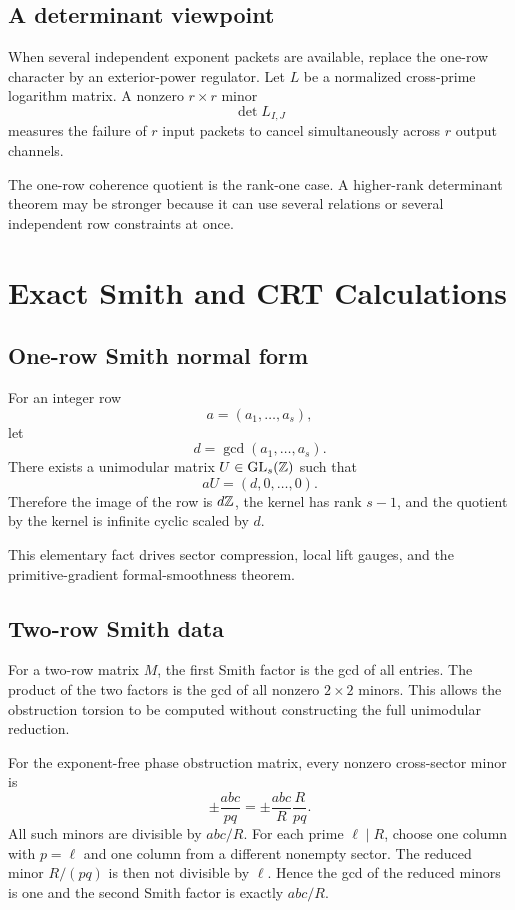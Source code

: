 \section{A determinant viewpoint}
When several independent exponent packets are available, replace the one-row character by an exterior-power regulator. Let $L$ be a normalized cross-prime logarithm matrix. A nonzero $r\times r$ minor
\[
 \det L_{I,J}
\]
measures the failure of $r$ input packets to cancel simultaneously across $r$ output channels.

The one-row coherence quotient is the rank-one case. A higher-rank determinant theorem may be stronger because it can use several relations or several independent row constraints at once.

\chapter{Exact Smith and CRT Calculations}

\section{One-row Smith normal form}
For an integer row
\[
 a=(a_1,\ldots,a_s),
\]
let
\[
 d=\gcd(a_1,\ldots,a_s).
\]
There exists a unimodular matrix $U\in\mathrm{GL}_s(\mathbb Z)$ such that
\[
 aU=(d,0,\ldots,0).
\]
Therefore the image of the row is $d\mathbb Z$, the kernel has rank $s-1$, and the quotient by the kernel is infinite cyclic scaled by $d$.

This elementary fact drives sector compression, local lift gauges, and the primitive-gradient formal-smoothness theorem.

\section{Two-row Smith data}
For a two-row matrix $M$, the first Smith factor is the gcd of all entries. The product of the two factors is the gcd of all nonzero $2\times2$ minors. This allows the obstruction torsion to be computed without constructing the full unimodular reduction.

For the exponent-free phase obstruction matrix, every nonzero cross-sector minor is
\[
 \pm\frac{abc}{pq}
 =
 \pm\frac{abc}{R}\frac{R}{pq}.
\]
All such minors are divisible by $abc/R$. For each prime $\ell\mid R$, choose one column with $p=\ell$ and one column from a different nonempty sector. The reduced minor $R/(pq)$ is then not divisible by $\ell$. Hence the gcd of the reduced minors is one and the second Smith factor is exactly $abc/R$.

